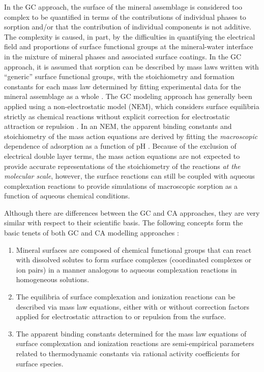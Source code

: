 In the GC approach, the surface of the mineral assemblage is
considered too complex to be quantified in terms of the contributions
of individual phases to sorption and/or that the contribution of
individual components is not additive. The complexity is caused, in
part, by the difficulties in quantifying the electrical field and
proportions of surface functional groups at the mineral-water
interface in the mixture of mineral phases and associated surface
coatings. In the GC approach, it is assumed that sorption can be
described by mass laws written with ``generic'' surface functional
groups, with the stoichiometry and formation constants for each mass
law determined by fitting experimental data for the mineral assemblage
as a whole \citep{hyun-2009, bond-2008, davis-2004}. 
The GC modeling approach has generally been applied using a
non-electrostatic model (NEM), which considers surface equilibria
strictly as chemical reactions without explicit correction for
electrostatic attraction or repulsion \citep{yabusaki-2008,
  davis-2004, kent-2000}. In an NEM, the apparent binding constants
and stoichiometry of the mass action equations are derived by fitting
the \textit{macroscopic} dependence of adsorption as a function of pH
\citep{davis-1998}. Because of the exclusion of electrical double
layer terms, the mass action equations are not expected to provide
accurate representations of the stoichiometry of the reactions
\textit{at the molecular scale}, however, the surface reactions can
still be coupled with aqueous complexation reactions to provide
simulations of macroscopic sorption as a function of aqueous chemical
conditions.

Although there are differences between the GC and CA approaches, 
they are very similar with respect to their scientific basis. 
The following concepts form the basic tenets of both GC and CA modelling approaches \citep{davis-1998}:

\begin{enumerate}
\item Mineral surfaces are composed of chemical functional groups that can react with dissolved solutes to form surface complexes (coordinated
complexes or ion pairs) in a manner analogous to aqueous complexation reactions in homogeneous solutions.

\item The equilibria of surface complexation and ionization reactions can be described via mass law equations, either with or without correction factors applied for electrostatic attraction to or repulsion from the surface.

\item The apparent binding constants determined for the mass law equations of surface complexation and ionization reactions are semi-empirical parameters related to thermodynamic constants via rational activity coefficients for surface species.
\end{enumerate}

